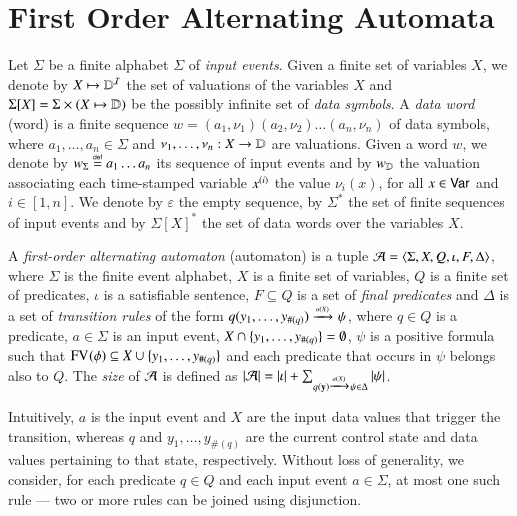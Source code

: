 \documentclass{llncs}
\begin{document}
\section{First Order Alternating Automata}

Let $\Sigma$ be a finite alphabet $\Sigma$ of \emph{input
  events}. Given a finite set of variables $X$, we denote by $X
\mapsto \mathbb{D}^{\mathcal{I}}$ the set of valuations of the variables $X$ and
$\Sigma[X] = \Sigma \times (X \mapsto \mathbb{D})$ be the possibly infinite
set of \emph{data symbols}. A \emph{data word} (word) is a finite
sequence $w=(a_1,\nu_1)(a_2,\nu_2) \ldots (a_n,\nu_n)$ of data
symbols, where $a_1,\ldots,a_n \in \Sigma$ and $\nu_1,\ldots,\nu_n : X
\rightarrow \mathbb{D}$ are valuations. Given a word $w$, we denote by
${w}_\Sigma \stackrel{\scriptscriptstyle{\mathsf{def}}}{=} a_1\ldots a_n$ its sequence of input events and by
${w}_{\mathbb{D}}$ the valuation associating each time-stamped variable
${x}^{({i})}$ the value $\nu_i(x)$, for all $x \in \mathsf{Var}$ and
$i\in[1,n]$. We denote by $\varepsilon$ the empty sequence, by
$\Sigma^*$ the set of finite sequences of input events and by
$\Sigma[X]^*$ the set of data words over the variables $X$.

A \emph{first-order alternating automaton} (automaton) is a tuple $\mathcal{A}
= \langle \Sigma,X,Q,\iota,F,\Delta \rangle$, where $\Sigma$ is the finite
event alphabet, $X$ is a finite set of variables, $Q$ is a finite set
of predicates, $\iota$ is a satisfiable sentence, $F \subseteq Q$ is a
set of \emph{final predicates} and $\Delta$ is a set of
\emph{transition rules} of the form \(q(y_1,\ldots,y_{\#(q)})
\xrightarrow{{\scriptscriptstyle a(X)}}_{{\scriptstyle }} \psi\), where $q \in Q$ is a predicate, $a \in \Sigma$
is an input event, $X \cap \{ y_1,\ldots,y_{\#(q)} \} = \emptyset$,
$\psi$ is a positive formula such that $\mathrm{FV}_{}(\phi) \subseteq X \cup
\{ y_1,\ldots,y_{\#(q)} \}$ and each predicate that occurs in $\psi$
belongs also to $Q$. The \emph{size} of $\mathcal{A}$ is defined as ${|{\mathcal{A}}|} =
{|{\iota}|} + \sum_{q(\mathbf y) \xrightarrow{{\scriptscriptstyle a(X)}}_{{\scriptstyle }} \psi \in \Delta}
{|{\psi}|}$.

Intuitively, $a$ is the input event and $X$ are the input data values
that trigger the transition, whereas $q$ and $y_1,\ldots,y_{\#(q)}$
are the current control state and data values pertaining to that
state, respectively. Without loss of generality, we consider, for each
predicate $q \in Q$ and each input event $a \in \Sigma$, at most one
such rule --- two or more rules can be joined using disjunction.
\end{document}
